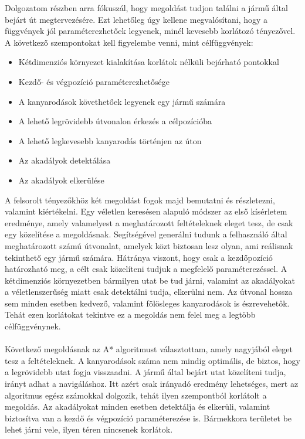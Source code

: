 

Dolgozatom részben arra fókuszál, hogy megoldást tudjon találni a jármű által bejárt út megtervezésére. Ezt lehetőleg úgy kellene megvalósítani, hogy a függvények jól paraméterezhetőek legyenek, minél kevesebb korlátozó tényezővel. A következő szempontokat kell figyelembe venni, mint célfüggvények:
\begin{itemize}
	\item Kétdimenziós környezet kialakítása korlátok nélküli bejárható pontokkal
	\item Kezdő- és végpozíció paraméterezhetősége
	\item A kanyarodások követhetőek legyenek egy jármű számára
	\item A lehető legrövidebb útvonalon érkezés a célpozícióba
	\item A lehető legkevesebb kanyarodás történjen az úton
	\item Az akadályok detektálása
	\item Az akadályok elkerülése
\end{itemize}

A felsorolt tényezőkhöz két megoldást fogok majd bemutatni és részletezni, valamint kiértékelni. Egy véletlen keresésen alapuló módszer az első kísérletem eredménye, amely valamelyest a meghatározott feltételeknek eleget tesz, de csak egy közelítése a megoldásnak. Segítségével generálni tudunk a felhasználó által meghatározott számú útvonalat, amelyek közt biztosan lesz olyan, ami reálisnak tekinthető egy jármű számára. Hátránya viszont, hogy csak a kezdőpozíció határozható meg, a célt csak közelíteni tudjuk a megfelelő paraméterezéssel. A kétdimenziós környezetben bármilyen utat be tud járni, valamint az akadályokat a véletlenszerűség miatt csak detektálni tudja, elkerülni nem. Az útvonal hossza sem minden esetben kedvező, valamint fölösleges kanyarodások is észrevehetők. Tehát ezen korlátokat tekintve ez a megoldás nem felel meg a legtöbb célfüggvénynek.
\\\\

Következő megoldásnak az A* algoritmust választottam, amely nagyjából eleget tesz a feltételeknek. A kanyarodások száma nem mindig optimális, de biztos, hogy a legrövidebb utat fogja visszaadni. A jármű által bejárt utat közelíteni tudja, irányt adhat a navigáláshoz. Itt azért csak irányadó eredmény lehetséges, mert az algoritmus egész számokkal dolgozik, tehát ilyen szempontból korlátolt a megoldás. Az akadályokat minden esetben detektálja és elkerüli, valamint biztosítva van a kezdő és végpozíció paraméterezése is. Bármekkora területet be lehet járni vele, ilyen téren nincsenek korlátok.  

